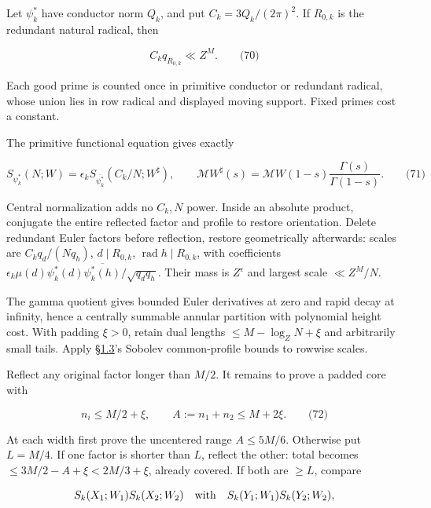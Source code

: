 Let \(\psi_k^*\) have conductor norm \(Q_k\), and put \(C_k=3Q_k/(2\pi)^2\). If \(R_{0,k}\) is the redundant natural radical, then

\hypertarget{cf:eq:D.6}{}

\label{cf:eq:D.6}

\[
C_kq_{R_{0,k}}\ll Z^M.
\qquad\text{(70)}
\]

Each good prime is counted once in primitive conductor or redundant radical, whose union lies in row radical and displayed moving support. Fixed primes cost a constant.

The primitive functional equation gives exactly

\hypertarget{cf:eq:D.7}{}

\label{cf:eq:D.7}

\[
S_{\psi_k^*}(N;W)=\epsilon_k S_{\overline{\psi_k^*}}(C_k/N;W^\sharp),\qquad
\mathcal MW^\sharp(s)=\mathcal MW(1-s)\frac{\Gamma(s)}{\Gamma(1-s)}.
\qquad\text{(71)}
\]

Central normalization adds no \(C_k,N\) power. Inside an absolute product, conjugate the entire reflected factor and profile to restore orientation. Delete redundant Euler factors before reflection, restore geometrically afterwards: scales are \(C_kq_d/(Nq_h)\), \(d\mid R_{0,k}\), \(\operatorname{rad}h\mid R_{0,k}\), with coefficients \(\epsilon_k\mu(d)\psi_k^*(d)\overline{\psi_k^*(h)}/\sqrt{q_dq_h}\). Their mass is \(Z^\epsilon\) and largest scale \(\ll Z^M/N\).

The gamma quotient gives bounded Euler derivatives at zero and rapid decay at infinity, hence a centrally summable annular partition with polynomial height cost. With padding \(\xi>0\), retain dual lengths \(\le M-\log_ZN+\xi\) and arbitrarily small tails. Apply §\protect\hyperlink{cf:sec:1.2}{1.3}'s Sobolev common-profile bounds to rowwise scales.

Reflect any original factor longer than \(M/2\). It remains to prove a padded core with

\hypertarget{cf:eq:D.8}{}

\label{cf:eq:D.8}

\[
n_i\le M/2+\xi,\qquad A:=n_1+n_2\le M+2\xi.
\qquad\text{(72)}
\]

At each width first prove the uncentered range \(A\le5M/6\). Otherwise put \(L=M/4\). If one factor is shorter than \(L\), reflect the other: total becomes \(\le3M/2-A+\xi<2M/3+\xi\), already covered. If both are \(\ge L\), compare

\[
S_k(X_1;W_1)S_k(X_2;W_2)
\quad\hbox{with}\quad
S_k(Y_1;W_1)S_k(Y_2;W_2),
\]

